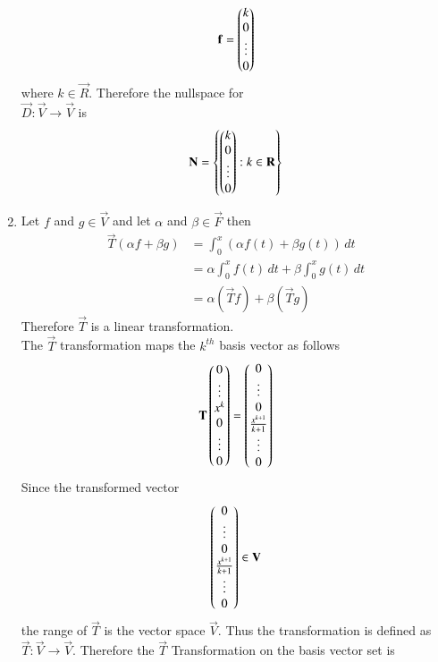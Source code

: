 \begin{enumerate}[label=\emph{\alph*)}]
\begin{align}
\mathbf{f}=\begin{pmatrix}k\\0\\\vdots\\0\end{pmatrix}
\end{align}
where $k \in \vec{R}$. Therefore the nullspace for \\$\vec{D}:\vec{V}\rightarrow\vec{V}$ is
\begin{align}
	\mathbf{N}=\left\{\begin{pmatrix}k\\0\\\vdots\\0\end{pmatrix}:k \in \mathbf{R}\right\}
\end{align}
\item
Let $f$ and $g \in \vec{V}$ and let $\alpha$ and $\beta \in \vec{F}$ then
\begin{align}
	\vec{T}(\alpha f + \beta g)&=\int_{0}^{x}(\alpha f(t) + \beta g(t))\,dt\\
	&=\alpha\int_{0}^{x} f(t)\,dt+\beta\int_{0}^{x} g(t)\,dt\\
     &=\alpha(\vec{T}f)+\beta(\vec{T}g)
\end{align}
Therefore $\vec{T}$ is a linear transformation.\\
The $\vec{T}$ transformation maps the $k^{th}$ basis vector as follows
\begin{align}
      \mathbf{T}\begin{pmatrix}0\\ \vdots \\ x^k \\0 \\ \vdots \\0\end{pmatrix}
      =\begin{pmatrix}0\\ \vdots \\ 0\\ \frac{x^{k+1}}{k+1} \\ \vdots \\0\end{pmatrix}
\end{align}
Since the transformed vector
\begin{align}
	\begin{pmatrix}0\\ \vdots \\ 0\\ \frac{x^{k+1}}{k+1} \\ \vdots \\0\end{pmatrix} \in \mathbf{V}
\end{align}
the range of $\vec{T}$ is the vector space $\vec{V}$. Thus the transformation is defined as 
$\vec{T} : \vec{V}\rightarrow \vec{V}$.
Therefore the $\vec{T}$ Transformation on the basis vector set is
                \begin{align}

\end{align}
\end{enumerate}

